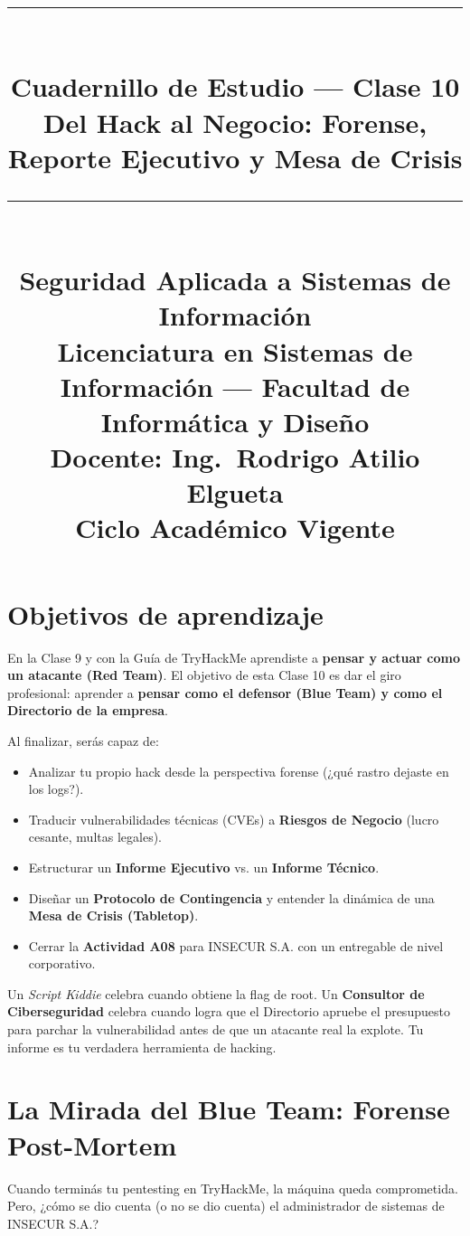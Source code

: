 \documentclass[11pt,a4paper]{article}
\title{%
  \rule{\textwidth}{1pt}\\[0.4cm]
  \textbf{\Large Cuadernillo de Estudio --- Clase 10}\\[0.2cm]
  \large Del Hack al Negocio: Forense, Reporte Ejecutivo y Mesa de Crisis\\[0.2cm]
  \rule{\textwidth}{1pt}\\[0.4cm]
  \normalsize Seguridad Aplicada a Sistemas de Información\\
  Licenciatura en Sistemas de Información --- Facultad de Informática y Diseño\\
  Docente: Ing.\ Rodrigo Atilio Elgueta\\[0.2cm]
  \small Ciclo Académico Vigente
}
\author{}
\date{}
\begin{document}
\maketitle
\thispagestyle{fancy}
\tableofcontents
\newpage

\section{Objetivos de aprendizaje}
En la Clase 9 y con la Guía de TryHackMe aprendiste a \textbf{pensar y actuar como un atacante (Red Team)}. El objetivo de esta Clase 10 es dar el giro profesional: aprender a \textbf{pensar como el defensor (Blue Team) y como el Directorio de la empresa}.

Al finalizar, serás capaz de:
\begin{itemize}[leftmargin=*]
  \item Analizar tu propio hack desde la perspectiva forense (¿qué rastro dejaste en los logs?).
  \item Traducir vulnerabilidades técnicas (CVEs) a \textbf{Riesgos de Negocio} (lucro cesante, multas legales).
  \item Estructurar un \textbf{Informe Ejecutivo} vs. un \textbf{Informe Técnico}.
  \item Diseñar un \textbf{Protocolo de Contingencia} y entender la dinámica de una \textbf{Mesa de Crisis (Tabletop)}.
  \item Cerrar la \textbf{Actividad A08} para INSECUR S.A. con un entregable de nivel corporativo.
\end{itemize}

\begin{clave}
Un \textit{Script Kiddie} celebra cuando obtiene la flag de root. Un \textbf{Consultor de Ciberseguridad} celebra cuando logra que el Directorio apruebe el presupuesto para parchar la vulnerabilidad antes de que un atacante real la explote. Tu informe es tu verdadera herramienta de hacking.
\end{clave}

\section{La Mirada del Blue Team: Forense Post-Mortem}
Cuando terminás tu pentesting en TryHackMe, la máquina queda comprometida. Pero, ¿cómo se dio cuenta (o no se dio cuenta) el administrador de sistemas de INSECUR S.A.?
\end{document}
